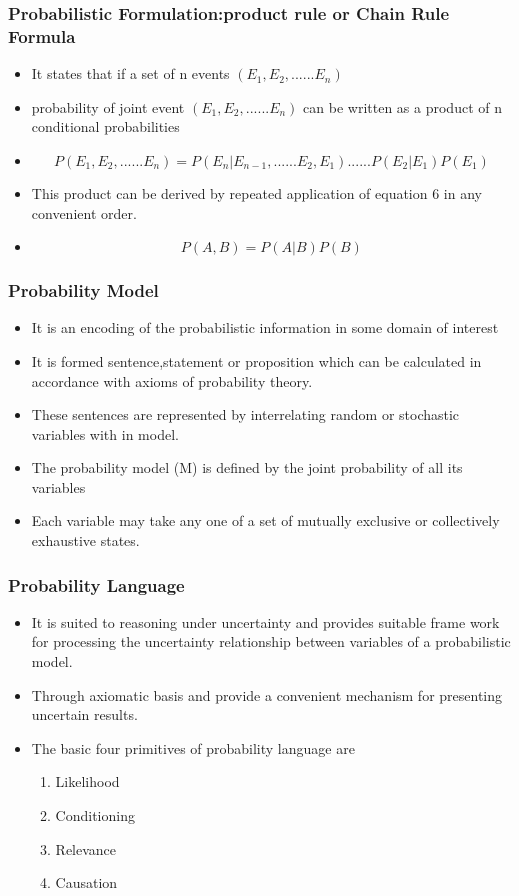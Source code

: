 \documentclass{beamer}
\begin{document}
\begin{frame}
\frametitle{\textbf{Probabilistic Formulation:product rule or Chain Rule Formula}}
\begin{itemize}
\item It states that if  a set of n events $(E{_1},E{_2},......E{_n})$
\item probability of joint event $(E_1,E{_2},......E{_n})$ can be written as a product of n conditional probabilities
\item \begin{equation}
    P(E{_1},E{_2},......E{_n})=P(E_{n}|E_{n-1},......E{_2},E{_1})......P(E{_2}|E{_1})P(E{_1})
\end{equation}

\item This product can be derived by repeated application of equation 6 in any convenient order.
\item \begin{equation}
P(A,B)=P(A|B)P(B)
\end{equation}
\end{itemize}
\end{frame}
\begin{frame}
\frametitle{\textbf{Probability Model}}
\begin{itemize}
\item  It is an encoding of the probabilistic information in some domain of interest
\item It is formed sentence,statement or proposition which can be calculated in accordance with axioms of probability theory.
\item These sentences are represented by interrelating random or stochastic variables with in model.
\item The  probability model (M) is defined by the joint probability of all its variables
\item Each variable may take any one of a set of mutually exclusive or collectively
exhaustive states.
\end{itemize}
\end{frame}

\begin{frame}
\frametitle{\textbf{Probability Language}}
\begin{itemize}
\item It is suited to reasoning under uncertainty and provides suitable frame work for processing the uncertainty relationship between variables of a probabilistic model.
\item Through  axiomatic basis and provide a convenient mechanism for presenting uncertain results.
\item The basic four primitives of probability language are
\begin{enumerate}
\item Likelihood
\item Conditioning
\item Relevance
\item Causation
\end{enumerate}
\end{itemize}
\end{frame}
\end{document}
